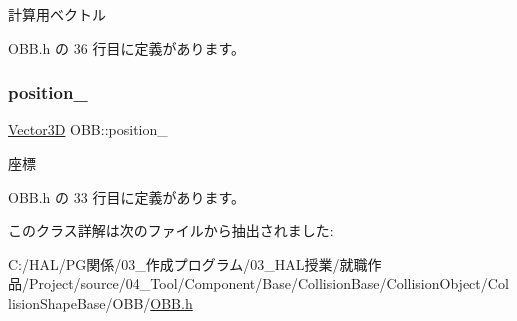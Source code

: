 計算用ベクトル 



 O\+B\+B.\+h の 36 行目に定義があります。

\mbox{\label{class_o_b_b_ab05a884fc030d7a3cf7b355880d9194c}} 
\subsubsection{\texorpdfstring{position\+\_\+}{position\_}}
{\footnotesize\ttfamily \mbox{\hyperlink{class_vector3_d}{Vector3D}} O\+B\+B\+::position\+\_\+\hspace{0.3cm}{\ttfamily [private]}}



座標 



 O\+B\+B.\+h の 33 行目に定義があります。



このクラス詳解は次のファイルから抽出されました\+:\begin{DoxyCompactItemize}
\item 
C\+:/\+H\+A\+L/\+P\+G関係/03\+\_\+作成プログラム/03\+\_\+\+H\+A\+L授業/就職作品/\+Project/source/04\+\_\+\+Tool/\+Component/\+Base/\+Collision\+Base/\+Collision\+Object/\+Collision\+Shape\+Base/\+O\+B\+B/\mbox{\hyperlink{_o_b_b_8h}{O\+B\+B.\+h}}\end{DoxyCompactItemize}
